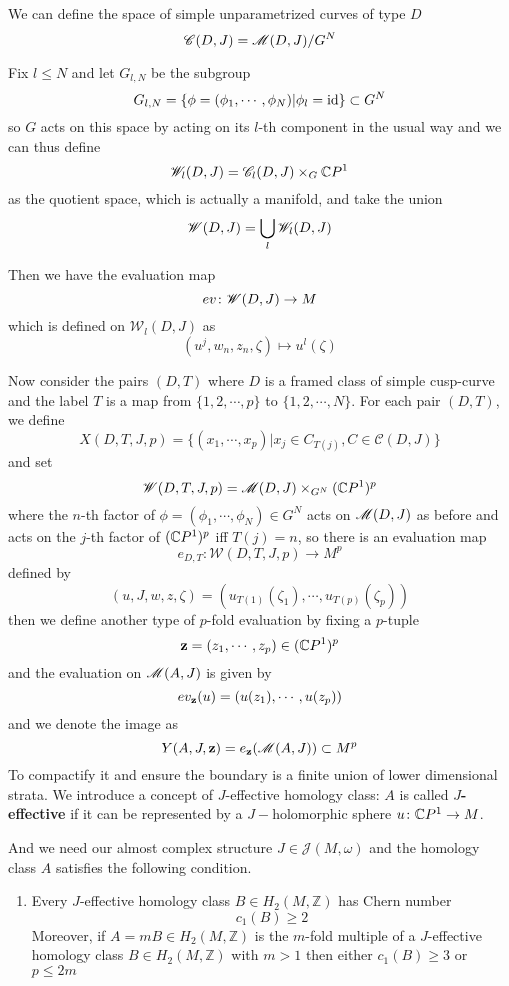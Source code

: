 \documentclass[twoside]{article}
\begin{document}
We can define the space of simple unparametrized curves of type $D$
\[\mathscr{C}(D,J)=\mathscr{M}(D,J)/G^N\]

Fix $l\leq N$ and let $G_{l,N}$ be the subgroup
\[G_{l,N}=\{\phi=(\phi_1,\cdots,\phi_N) |\phi_l=\operatorname{id}  \}\subset G^N\]
so $G$ acts on this space by acting on its $l$-th component in the usual way and we can thus define
\[\mathscr{W}_l(D,J)=\mathscr{C}_l(D,J)\times_G \mathbb{C}P^{1}\]
as the quotient space, which is actually a manifold, and take the union
\[\mathscr{W}(D,J)=\bigcup_l \mathscr{W}_l(D,J)\]

Then we have the evaluation map
\[ev\colon \mathscr{W}(D,J)\rightarrow M\]
which is defined on $\mathscr{W}_l(D,J)$ as
\[(u^j,w_n,z_n,\zeta)\mapsto u^l(\zeta)\]

Now consider the pairs $(D,T)$ where $D$ is a framed class of 
simple cusp-curve and the label $T$ is a map from $\{1,2,\cdots,p \}$ to $\{1,2,\cdots,N \}$. 
For each pair $(D,T)$, we define 
\[X(D,T,J,p)=\{(x_1,\cdots,x_p)|x_j\in C_{T(j)},C\in\mathscr{C}(D,J)   \}\]
and set
\[\mathscr{W}(D,T,J,p)=\mathscr{M}(D,J)\times_{G^N}(\mathbb{C}P^{1})^p\]
where the $n$-th factor of $\phi=(\phi_1,\cdots,\phi_N)\in G^N$ acts on $\mathscr{M}(D,J)$ as before 
and acts on the $j$-th factor of $(\mathbb{C}P^{1})^p$ iff $T(j)=n$, so there is an evaluation map
\[e_{D,T}\colon \mathscr{W}(D,T,J,p)\rightarrow M^p\]
defined by
\[(u,J,w,z,\zeta)=(u_{T(1)}(\zeta_1),\cdots,u_{T(p)}(\zeta_p))\]
then we define another type of $p$-fold evaluation by fixing a $p$-tuple 
\[\mathbf{z}=(z_1,\cdots,z_p)\in(\mathbb{C}P^{1})^p\]
and the evaluation on $\mathscr{M}(A,J)$ is given by
\[ev_{\mathbf{z}}(u)=(u(z_1),\cdots,u(z_p))\]
and we denote the image as 
\[Y(A,J,\mathbf{z})=e_{\mathbf{z}}(\mathscr{M}(A,J))\subset M^p\]
To compactify it and ensure the boundary is a finite union of lower dimensional strata. 
We introduce a concept of $J$-effective homology class: $A$ is called \textbf{$J$-effective} 
if it can be represented by a $J-$holomorphic sphere $u\colon \mathbb{C}P^{1}\rightarrow M$.

And we need our almost complex structure $J\in\mathscr{J}(M,\omega)$ 
and the homology class $A$ satisfies the following condition.

\begin{enumerate}[label=(\arabic*)]
    \item Every $J$-effective homology class $B\in H_2(M,\mathbb{Z})$ has Chern number
    \[c_1(B)\geq 2\]
    Moreover, if $A=mB\in H_2(M,\mathbb{Z})$ is the $m$-fold multiple of a $J$-effective 
    homology class $B\in H_2(M,\mathbb{Z})$ with $m>1$ then either $c_1(B)\geq 3$ or $p\leq 2m$
\end{enumerate}
\end{document}
